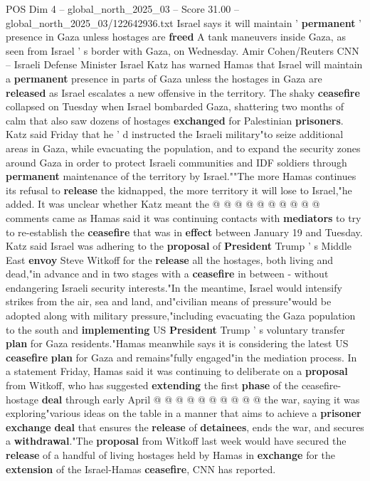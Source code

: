 \begin{textsample}{POS Dim 4 – global\_north\_2025\_03 – Score 31.00 – global\_north\_2025\_03/122642936.txt}  \label{ex:f4_pos_067}
Israel says it will maintain ' \textbf{permanent} ' presence in Gaza unless hostages are \textbf{freed} A tank maneuvers inside Gaza, as seen from Israel ' s border with Gaza, on Wednesday.
Amir Cohen/Reuters CNN -- Israeli Defense Minister Israel Katz has warned Hamas that Israel will maintain a \textbf{permanent} presence in parts of Gaza unless the hostages in Gaza are \textbf{released} as Israel escalates a new offensive in the territory.
The shaky \textbf{ceasefire} collapsed on Tuesday when Israel bombarded Gaza, shattering two months of calm that also saw dozens of hostages \textbf{exchanged} for Palestinian \textbf{prisoners}.
Katz said Friday that he ' d instructed the Israeli military"to seize additional areas in Gaza, while evacuating the population, and to expand the security zones around Gaza in order to protect Israeli communities and IDF soldiers through \textbf{permanent} maintenance of the territory by Israel.""The more Hamas continues its refusal to \textbf{release} the kidnapped, the more territory it will lose to Israel,"he added.
It was unclear whether Katz meant the @ @ @ @ @ @ @ @ @ @ comments came as Hamas said it was continuing contacts with \textbf{mediators} to try to re-establish the \textbf{ceasefire} that was in \textbf{effect} between January 19 and Tuesday.
Katz said Israel was adhering to the \textbf{proposal} of \textbf{President} Trump ' s Middle East \textbf{envoy} Steve Witkoff for the \textbf{release} all the hostages, both living and dead,"in advance and in two stages with a \textbf{ceasefire} in between - without endangering Israeli security interests."In the meantime, Israel would intensify strikes from the air, sea and land, and"civilian means of pressure"would be adopted along with military pressure,"including evacuating the Gaza population to the south and \textbf{implementing} US \textbf{President} Trump ' s voluntary transfer \textbf{plan} for Gaza residents."Hamas meanwhile says it is considering the latest US \textbf{ceasefire} \textbf{plan} for Gaza and remains"fully engaged"in the mediation process.
In a statement Friday, Hamas said it was continuing to deliberate on a \textbf{proposal} from Witkoff, who has suggested \textbf{extending} the first \textbf{phase} of the ceasefire-hostage \textbf{deal} through early April @ @ @ @ @ @ @ @ @ @ the war, saying it was exploring"various ideas on the table in a manner that aims to achieve a \textbf{prisoner} \textbf{exchange} \textbf{deal} that ensures the \textbf{release} of \textbf{detainees}, ends the war, and secures a \textbf{withdrawal}."The \textbf{proposal} from Witkoff last week would have secured the \textbf{release} of a handful of living hostages held by Hamas in \textbf{exchange} for the \textbf{extension} of the Israel-Hamas \textbf{ceasefire}, CNN has reported.

\end{textsample}
